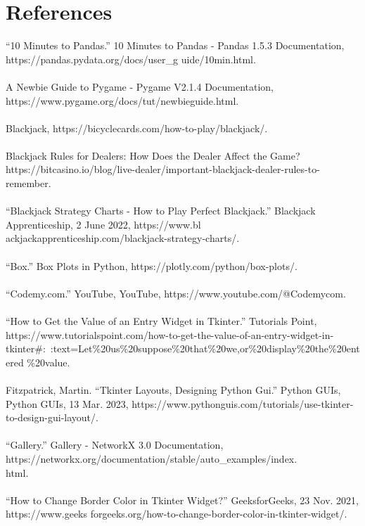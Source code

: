 \documentclass[fontsize=11pt]{article}
\begin{document}
\section*{References}
“10 Minutes to Pandas.” 10 Minutes to Pandas - Pandas 1.5.3 Documentation, https://pandas.pydata.org/docs/user\_g uide/10min.html.
\\\\
A Newbie Guide to Pygame - Pygame V2.1.4 Documentation, https://www.pygame.org/docs/tut/newbieguide.html.
\\
\\
    Blackjack, https://bicyclecards.com/how-to-play/blackjack/.
\\
\\
    Blackjack Rules for Dealers: How Does the Dealer Affect the Game? https://bitcasino.io/blog/live-dealer/important-blackjack-dealer-rules-to-remember.
\\
\\
    “Blackjack Strategy Charts - How to Play Perfect Blackjack.” Blackjack Apprenticeship, 2 June 2022, https://www.bl\\ackjackapprenticeship.com/blackjack-strategy-charts/.
\\
\\
    “Box.” Box Plots in Python, https://plotly.com/python/box-plots/.
\\
\\
“Codemy.com.” YouTube, YouTube, https://www.youtube.com/@Codemycom.
\\\\
“How to Get the Value of an Entry Widget in Tkinter.” Tutorials Point, https://www.tutorialspoint.com/how-to-get-the-value-of-an-entry-widget-in-tkinter#:~:text=Let\%20us\%20suppose\%20that\%20we,or\%20display\%20the\%20entered \%20value.
\\\\
Fitzpatrick, Martin. “Tkinter Layouts, Designing Python Gui.” Python GUIs, Python GUIs, 13 Mar. 2023, https://www.pythonguis.com/tutorials/use-tkinter-to-design-gui-layout/.
\\\\
    “Gallery.” Gallery - NetworkX 3.0 Documentation, https://networkx.org/documentation/stable/auto\_examples/index.\\html.
\\\\
“How to Change Border Color in Tkinter Widget?” GeeksforGeeks, 23 Nov. 2021, https://www.geeks forgeeks.org/how-to-change-border-color-in-tkinter-widget/.
\\\\
\end{document}
